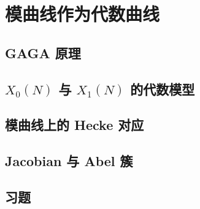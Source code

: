 \chapter{模曲线作为代数曲线}
\label{ch:modular-curves-algebraic}

\section{GAGA 原理}


\section{$X_0(N)$ 与 $X_1(N)$ 的代数模型}


\section{模曲线上的 Hecke 对应}


\section{Jacobian 与 Abel 簇}


\section{习题}

